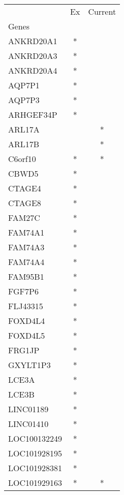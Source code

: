 \begin{tabular}{lcc}
\toprule
{} & Ex & Current \\
Genes              &    &         \\
\midrule
ANKRD20A1          &  * &         \\
ANKRD20A3          &  * &         \\
ANKRD20A4          &  * &         \\
AQP7P1             &  * &         \\
AQP7P3             &  * &         \\
ARHGEF34P          &  * &         \\
ARL17A             &    &       * \\
ARL17B             &    &       * \\
C6orf10            &  * &       * \\
CBWD5              &  * &         \\
CTAGE4             &  * &         \\
CTAGE8             &  * &         \\
FAM27C             &  * &         \\
FAM74A1            &  * &         \\
FAM74A3            &  * &         \\
FAM74A4            &  * &         \\
FAM95B1            &  * &         \\
FGF7P6             &  * &         \\
FLJ43315           &  * &         \\
FOXD4L4            &  * &         \\
FOXD4L5            &  * &         \\
FRG1JP             &  * &         \\
GXYLT1P3           &  * &         \\
LCE3A              &  * &         \\
LCE3B              &  * &         \\
LINC01189          &  * &         \\
LINC01410          &  * &         \\
LOC100132249       &  * &         \\
LOC101928195       &  * &         \\
LOC101928381       &  * &         \\
LOC101929163       &  * &       * \\

\end{tabular}
